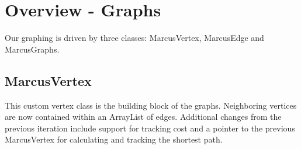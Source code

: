 \documentclass[letterpaper, 10pt]{article}
\begin{document}
\section{Overview - Graphs}

\hspace{1.0em}Our graphing is driven by three classes: MarcusVertex, MarcusEdge and MarcusGraphs.

\subsection{MarcusVertex}

\hspace{1.0em}This custom vertex class is the building block of the graphs. Neighboring vertices are now contained within an ArrayList of edges. Additional changes from the previous iteration include support for tracking cost and a pointer to the previous MarcusVertex for calculating and tracking the shortest path.
\end{document}
